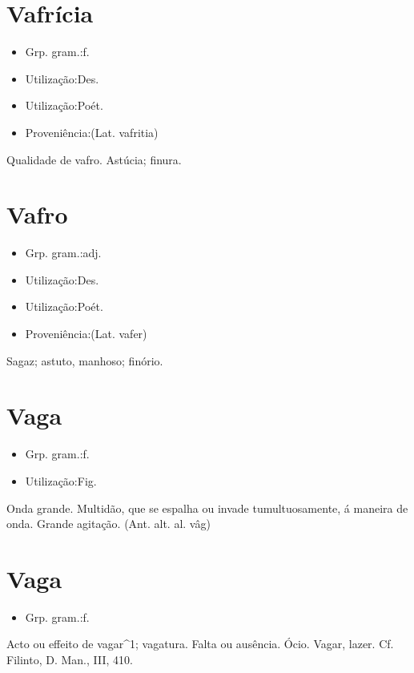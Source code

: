 \documentclass{article}
\begin{document}
\section{Vafrícia}
\begin{itemize}
\item {Grp. gram.:f.}
\end{itemize}
\begin{itemize}
\item {Utilização:Des.}
\end{itemize}
\begin{itemize}
\item {Utilização:Poét.}
\end{itemize}
\begin{itemize}
\item {Proveniência:(Lat. \textunderscore vafritia\textunderscore )}
\end{itemize}
Qualidade de vafro.
Astúcia; finura.
\section{Vafro}
\begin{itemize}
\item {Grp. gram.:adj.}
\end{itemize}
\begin{itemize}
\item {Utilização:Des.}
\end{itemize}
\begin{itemize}
\item {Utilização:Poét.}
\end{itemize}
\begin{itemize}
\item {Proveniência:(Lat. \textunderscore vafer\textunderscore )}
\end{itemize}
Sagaz; astuto, manhoso; finório.
\section{Vaga}
\begin{itemize}
\item {Grp. gram.:f.}
\end{itemize}
\begin{itemize}
\item {Utilização:Fig.}
\end{itemize}
Onda grande.
Multidão, que se espalha ou invade tumultuosamente, á maneira de onda.
Grande agitação.
(Ant. alt. al. \textunderscore vâg\textunderscore )
\section{Vaga}
\begin{itemize}
\item {Grp. gram.:f.}
\end{itemize}
Acto ou effeito de vagar^1; vagatura.
Falta ou ausência.
Ócio.
Vagar, lazer. Cf. Filinto, \textunderscore D. Man.\textunderscore , III, 410.
\end{document}
